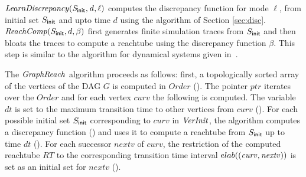 $\mathit{LearnDiscrepancy(S_{\sf init},d,\ell)}$ computes
the discrepancy function for mode $\ell$, from initial set $S_{\sf
  init}$ and upto time $d$ using the algorithm of Section \ref{sec:disc}. $\mathit{ReachComp}(S_{\sf init},d,\beta)$ first
generates finite simulation traces from  $S_{\sf init}$
and then bloats the traces to compute a reachtube using the discrepancy function $\beta$. This step is similar to the algorithm for dynamical systems  given in~\cite{DMV:EMSOFT2013}.

The $\mathit{GraphReach}$ algorithm proceeds as follows: first, a topologically sorted array of the vertices of the DAG $G$ is computed in  $\mathit{Order}$ (). 
The pointer $ptr$ iterates over the $\mathit{Order}$ and for each vertex $\mathit{curv}$ the following is computed. 
The variable $\mathit{dt}$  is set to the maximum transition time to other vertices from $\mathit{curv}$ (). 
For each possible initial set $S_{\sf init}$ corresponding to $\mathit{curv}$ in $\mathit{VerInit}$, the algorithm computes a discrepancy function () and uses it to compute a reachtube from $S_{\sf init}$ up to time $\mathit{dt}$ (). 
For each successor $\mathit{nextv}$ of $\mathit{curv}$, the restriction of the computed reachtube $RT$ to the corresponding transition time interval ${\sc elab}((\mathit{curv,nextv}))$ is set as  an initial set for $\mathit{nextv}$ ().

